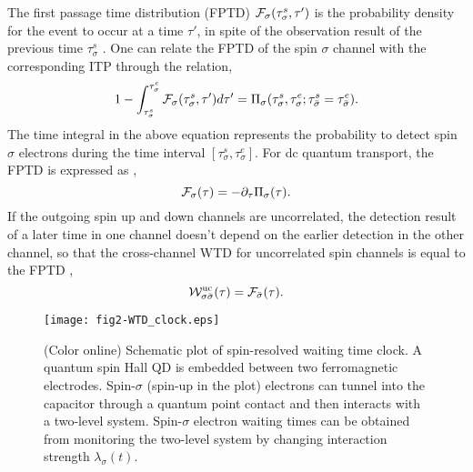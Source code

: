 \documentclass[aps,prb,twocolumn,footinbib,showpacs,superscriptaddress,preprintnumbers,amsmath,amssymb]{revtex4-1}
\begin{document}
	The first passage time distribution (FPTD) ${\cal F}_\sigma(\tau_\sigma^s, \tau')$ is the probability density for the event to occur at a time $\tau'$, in spite of the observation result of the previous time $\tau_\sigma^s$ \cite{kampen, WTD_correlated, gm1}. One can relate the FPTD of the spin $\sigma$ channel with the corresponding ITP through the relation, 
\begin{equation}
1-\int_{\tau_\sigma^s}^{\tau_\sigma^e} {\cal F}_\sigma(\tau_\sigma^s, \tau') d\tau' = \Pi_\sigma(\tau_\sigma^s, \tau_\sigma^e; \tau_{\bar{\sigma}}^s=\tau_{\bar{\sigma}}^e) .
\end{equation}
The time integral in the above equation represents the probability to detect spin $\sigma$ electrons during the time interval $[\tau_\sigma^s, \tau_\sigma^e]$. For dc quantum transport, the FPTD is expressed as \cite{gm1}, 
\begin{equation}
{\cal F}_\sigma(\tau) = -\partial_{\tau} \Pi_\sigma(\tau).
\end{equation}
If the outgoing spin up and down channels are uncorrelated, the detection result of a later time in one channel doesn't depend on the earlier detection in the other channel, so that the cross-channel WTD for uncorrelated spin channels is equal to the FPTD \cite{WTD_correlated}, 
\begin{equation}
{\cal W}_{\sigma\bar{\sigma}}^{\rm uc}(\tau) = {\cal F}_{\bar{\sigma}}(\tau) .
\end{equation}


\begin{figure}
  \texttt{[image: fig2-WTD\_clock.eps]} \\
  \caption{(Color online) Schematic plot of spin-resolved waiting time clock. A quantum spin Hall QD is embedded between two ferromagnetic electrodes. Spin-$\sigma$ (spin-up in the plot) electrons can tunnel into the capacitor through a quantum point contact and then interacts with a two-level system. Spin-$\sigma$ electron waiting times can be obtained from monitoring the two-level system by changing interaction strength $\lambda_\sigma(t)$. }
  \label{fig2-clock}
\end{figure}
\end{document}

